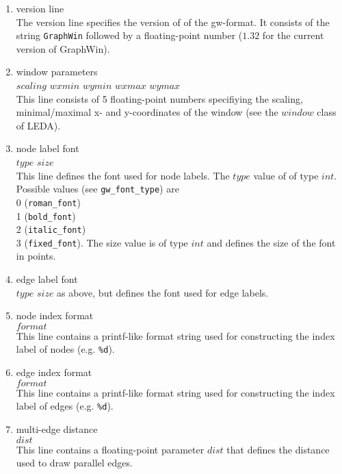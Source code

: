 \begin{enumerate}
\item version line\\
The version line specifies the version of of the gw-format. It consists
of the string {\tt GraphWin} followed by a floating-point number
($1.32$ for the current version of GraphWin).

\item window parameters\\
$scaling$ $wxmin$ $wymin$ $wxmax$ $wymax$\\
This line consists of 5 floating-point numbers specifiying the
scaling, minimal/maximal x- and y-coordinates of the window
(see the $window$ class of LEDA).

\item {node label font}\\
$type$ $size$\\
This line defines the font used for node labels. The $type$
value of of type $int$. Possible values (see {\tt gw\_font\_type}) are\\
0 ({\tt roman\_font})\\
1 ({\tt bold\_font})\\
2 ({\tt italic\_font})\\
3 ({\tt fixed\_font}).
The size value is of type $int$ and defines the size of the font
in points.

\item {edge label font}\\
$type$ $size$
as above, but defines the font used for edge labels.

\item {node index format}\\
$format$\\
This line contains a printf-like format string used
for constructing the index label of nodes (e.g. {\tt \%d}).

\item {edge index format}\\
$format$\\
This line contains a printf-like format string used
for constructing the index label of edges (e.g. {\tt \%d}).

\item {multi-edge distance}\\
$dist$\\
This line contains a floating-point parameter $dist$ that
defines the distance used to draw parallel edges.

\end{enumerate}

